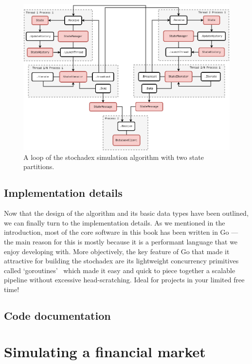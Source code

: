 \documentclass{book}
\begin{document}
\begin{figure}[h]
\centering
\includegraphics[width=15cm]{images/stochadex-loop.drawio.png}
\caption{A loop of the stochadex simulation algorithm with two state partitions.}
\label{fig:loop-design}
\end{figure}


\section{\sffamily Implementation details}

Now that the design of the algorithm and its basic data types have been outlined, we can finally turn to the implementation details. As we mentioned in the introduction, most of the core software in this book has been written in Go --- the main reason for this is mostly because it is a performant language that we enjoy developing with. More objectively, the key feature of Go that made it attractive for building the stochadex are its lightweight concurrency primitives called `goroutines'~\cite{goroutines} which made it easy and quick to piece together a scalable pipeline without excessive head-scratching. Ideal for projects in your limited free time!

\section{\sffamily Code documentation}

\chapter{\sffamily Simulating a financial market}
\end{document}

